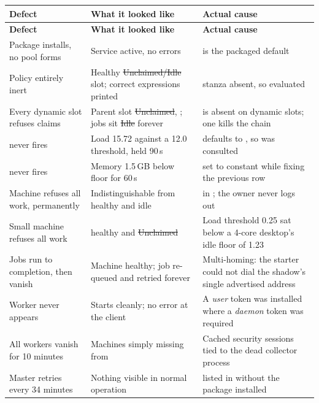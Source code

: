 \begin{longtable}{L{0.27\textwidth} L{0.30\textwidth} L{0.31\textwidth}}
\toprule
\textbf{Defect} & \textbf{What it looked like} & \textbf{Actual cause} \\
\midrule
\endfirsthead
\toprule
\textbf{Defect} & \textbf{What it looked like} & \textbf{Actual cause} \\
\midrule
\endhead
\bottomrule
\endfoot
Package installs, no pool forms & Service active, no errors &  is the packaged default \\
\addlinespace
Policy entirely inert & Healthy \st{Unclaimed/Idle} slot; correct expressions printed &  stanza absent, so  evaluated  \\
\addlinespace
Every dynamic slot refuses claims & Parent slot \st{Unclaimed}, ; jobs sit \st{Idle} forever &  is absent on dynamic slots; one  kills the \kn{\&\&} chain \\
\addlinespace
{} never fires & Load 15.72 against a 12.0 threshold, held 90\,s &  defaults to , so  was consulted \\
\addlinespace
{} never fires & Memory 1.5\,GB below floor for 60\,s &  set to constant  while fixing the previous row \\
\addlinespace
Machine refuses all work, permanently & Indistinguishable from healthy and idle &  in ; the owner never logs out \\
\addlinespace
Small machine refuses all work &  healthy and \st{Unclaimed} & Load threshold 0.25 sat below a 4-core desktop's idle floor of 1.23 \\
\addlinespace
Jobs run to completion, then vanish & Machine healthy; job re-queued and retried forever & Multi-homing: the starter could not dial the shadow's single advertised address \\
\addlinespace
Worker never appears & Starts cleanly; no error at the client & A \emph{user} token was installed where a \emph{daemon} token was required \\
\addlinespace
All workers vanish for 10 minutes & Machines simply missing from  & Cached security sessions tied to the dead collector process \\
\addlinespace
Master retries every 34 minutes & Nothing visible in normal operation &  listed in  without the package installed \\
\end{longtable}

